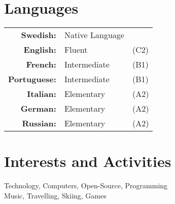 \documentclass[a4paper,10pt]{article}
\begin{document}
\section{Languages}
\begin{tabular}{rll}
\textbf{Swedish:}&Native Language\\
\textbf{English:}&Fluent&(C2)\\
\textbf{French:}&Intermediate&(B1)\\
\textbf{Portuguese:}&Intermediate&(B1)\\
\textbf{Italian:}&Elementary&(A2)\\
\textbf{German:}&Elementary&(A2) \\
\textbf{Russian:}&Elementary&(A2)
\end{tabular}

\section{Interests and Activities}
Technology, Computers, Open-Source, Programming\\
Music, Travelling, Skiing, Games
\end{document}
